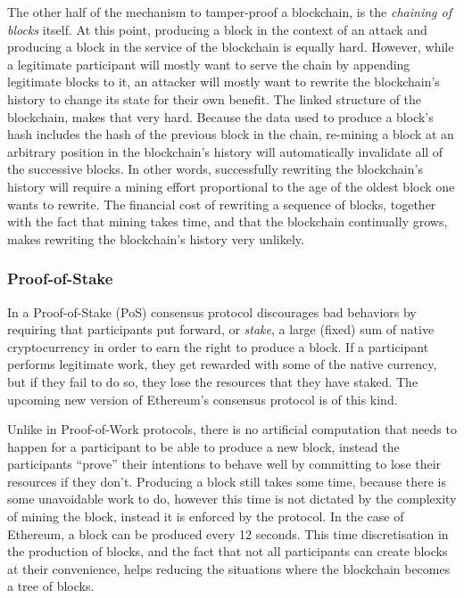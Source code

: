 \documentclass{article}
\begin{document}
The other half of the mechanism to tamper-proof a blockchain, is the
\emph{chaining of blocks} itself. At this point, producing a block in the
context of an attack and producing a block in the service of the blockchain is
equally hard. However, while a legitimate participant will mostly want to serve
the chain by appending legitimate blocks to it, an attacker will mostly want to
rewrite the blockchain's history to change its state for their own benefit. The
linked structure of the blockchain, makes that very hard. Because the data used
to produce a block's hash includes the hash of the previous block in the chain,
re-mining a block at an arbitrary position in the blockchain's history will
automatically invalidate all of the successive blocks. In other words,
successfully rewriting the blockchain's history will require a mining effort
proportional to the age of the oldest block one wants to rewrite. The financial
cost of rewriting a sequence of blocks, together with the fact that mining
takes time, and that the blockchain continually grows, makes rewriting the
blockchain's history very unlikely.

\subsubsection{Proof-of-Stake}

In a Proof-of-Stake (PoS) consensus protocol discourages bad behaviors by
requiring that participants put forward, or \emph{stake}, a large (fixed) sum
of native cryptocurrency in order to earn the right to produce a block. If a
participant performs legitimate work, they get rewarded with some of the native
currency, but if they fail to do so, they lose the resources that they have
staked. The upcoming new version of Ethereum's consensus protocol is of this
kind.

Unlike in Proof-of-Work protocols, there is no artificial computation that
needs to happen for a participant to be able to produce a new block, instead
the participants ``prove'' their intentions to behave well by committing to
lose their resources if they don't. Producing a block still takes some time,
because there is some unavoidable work to do, however this time is not dictated
by the complexity of mining the block, instead it is enforced by the protocol.
In the case of Ethereum, a block can be produced every 12 seconds. This time
discretisation in the production of blocks, and the fact that not all
participants can create blocks at their convenience, helps reducing the
situations where the blockchain becomes a tree of blocks.
\end{document}
